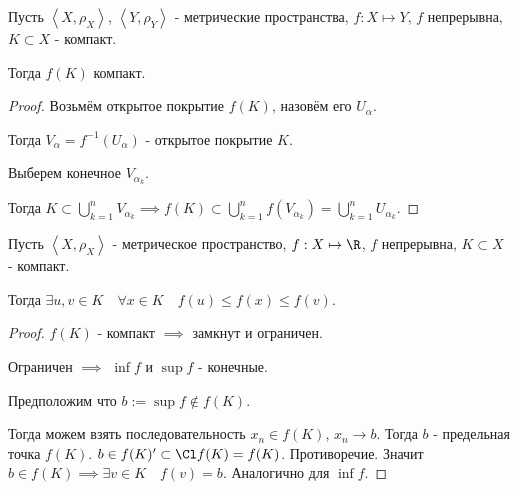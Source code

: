 
\begin{theorem} \thmslashn

    Пусть $\left<X, \rho_{X}\right>$, $\left<Y, \rho_{Y}\right>$ - метрические пространства, $f : X \mapsto Y$, $f$ непрерывна, $K \subset X$ - компакт.

    Тогда $f(K)$ компакт.

    \begin{proof} \thmslashn
    
        Возьмём открытое покрытие $f(K)$, назовём его $U_{\alpha}$.

        Тогда $V_{\alpha} = f^{-1}(U_{\alpha})$ - открытое покрытие $K$.

        Выберем конечное $V_{\alpha_{k}}$.

        Тогда $K \subset \bigcup\limits_{k=1}^{n} V_{\alpha_{k}} \implies f(K) \subset \bigcup\limits_{k=1}^{n} f(V_{\alpha_{k}}) = \bigcup\limits_{k=1}^{n} U_{\alpha_{k}}   $.
    \end{proof}
\end{theorem}
\begin{theorem}[Вейерштрасса] \thmslashn

    Пусть $\left<X, \rho_{X}\right>$ - метрическое пространство, $f : X \mapsto \R$, $f$ непрерывна, $K \subset X$ - компакт.

    Тогда $\exists{u, v\in K}\quad \forall{x\in K}\quad f(u) \le f(x) \le f(v)$.
    \begin{proof} \thmslashn
    
        $f(K)$ - компакт $\implies$ замкнут и ограничен.

        Ограничен $\implies$ $\inf f$ и $\sup f$ - конечные.

        Предположим что $b := \sup f \not\in f(K)$.

        Тогда можем взять последовательность $x_{n}\in f(K)$, $x_{n} \to b$. Тогда $b$ - предельная точка $f(K)$. $b\in f(K)' \subset \Cl f(K) = f(K)$. Противоречие. Значит $b\in f(K) \implies \exists{v\in K}\quad f(v) = b$. Аналогично для $\inf f$.
    \end{proof}
\end{theorem}

